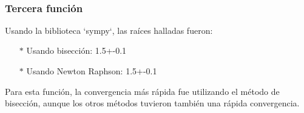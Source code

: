 \documentclass[titlepage,a4paper]{article}
\begin{document}
\\%

\subsubsection{Tercera función}\label{sec:CR3}

Usando la biblioteca `sympy`, las raíces halladas fueron:
\begin{itemize}
    \item[$*$]Usando bisección:   1.5+-0.1
    \item[$*$]Usando Newton Raphson:  1.5+-0.1
\end{itemize}

Para esta función, la convergencia más rápida fue utilizando el método de bisección, aunque los otros métodos tuvieron también una rápida convergencia. 
\end{document}
